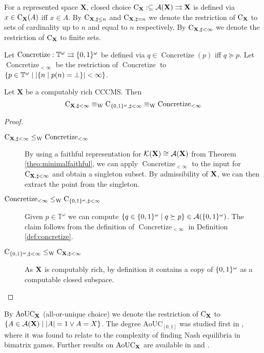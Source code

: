 \documentclass{eptcs-modified}
\begin{document}
\begin{definition}
For a represented space $\mathbf{X}$, closed choice $\textrm{C}_{\mathbf{X}} : \subseteq \mathcal{A}(\mathbf{X}) \rightrightarrows \mathbf{X}$ is defined via $x \in \textrm{C}_{\mathbf{X}}(A)$ iff $x \in A$. By $\textrm{C}_{\mathbf{X},\sharp \leq n}$ and $\textrm{C}_{\mathbf{X},\sharp=n}$ we denote the restriction of $\textrm{C}_{\mathbf{X}}$ to sets of cardinality up to $n$ and equal to $n$ respectively. By $\textrm{C}_{\mathbf{X},\sharp<\infty}$ we denote the restriction of $\textrm{C}_{\mathbf{X}}$ to finite sets.
\end{definition}

\begin{definition}
\label{def:concretize}
Let $\operatorname{Concretize} : \mathbb{T}^\omega \rightrightarrows {\{0,1\}^\omega}$ be defined via $q \in \operatorname{Concretize}(p)$ iff $q \succeq p$. Let $\operatorname{Concretize}_{<\infty}$ be the restriction of $\operatorname{Concretize}$ to $\{p \in \mathbb{T}^\omega \mid |\{n \mid p(n) = \bot\}| < \infty\}$.
\end{definition}

\begin{corollary}
Let $\mathbf{X}$ be a computably rich CCCMS. Then
\[\textrm{C}_{\mathbf{X},\sharp<\infty} \equiv_{\textrm{W}} \textrm{C}_{{\{0,1\}^\omega},\sharp<\infty} \equiv_{\textrm{W}} \operatorname{Concretize}_{<\infty}\]
\begin{proof}
\begin{description}
\item[$\textrm{C}_{\mathbf{X},\sharp<\infty} \leq_{\textrm{W}} \operatorname{Concretize}_{<\infty}$] By using a faithful representation for $\mathcal{K}(\mathbf{X}) \cong \mathcal{A}(\mathbf{X})$ from Theorem \ref{theo:minimalfaithful}, we can apply $\operatorname{Concretize}_{<\infty}$ to the input for $\textrm{C}_{\mathbf{X},\sharp<\infty}$ and obtain a singleton subset. By admissibility of $\mathbf{X}$, we can then extract the point from the singleton.
\item[$\operatorname{Concretize}_{<\infty} \leq_{\textrm{W}} \textrm{C}_{{\{0,1\}^\omega},\sharp<\infty}$] Given $p \in \mathbb{T}^\omega$ we can compute $\{q \in {\{0,1\}^\omega} \mid q \succeq p\} \in \mathcal{A}({\{0,1\}^\omega})$. The claim follows from the definition of $\operatorname{Concretize}_{<\infty}$ in Definition \ref{def:concretize}.
\item[$\textrm{C}_{{\{0,1\}^\omega},\sharp<\infty} \leq_{\textrm{W}} \textrm{C}_{\mathbf{X},\sharp<\infty}$] As $\mathbf{X}$ is computably rich, by definition it contains a copy of ${\{0,1\}^\omega}$ as a computable closed subspace.
\end{description}
\end{proof}
\end{corollary}

By $\mathrm{AoUC}_{\mathbf{X}}$ (all-or-unique choice) we denote the restriction of $\textrm{C}_{\mathbf{X}}$ to $\{A \in \mathcal{A}(\mathbf{X}) \mid |A| = 1 \vee A = X\}$. The degree $\mathrm{AoUC}_{[0,1]}$ was studied first in \cite{paulyincomputabilitynashequilibria}, where it was found to relate to the complexity of finding Nash equilibria in bimatrix games. Further results on $\mathrm{AoUC}_{\mathbf{X}}$ are available in \cite[Section 16 \& 17]{hoelzl} and \cite{pauly-kihara2-mfcs}.
\end{document}
